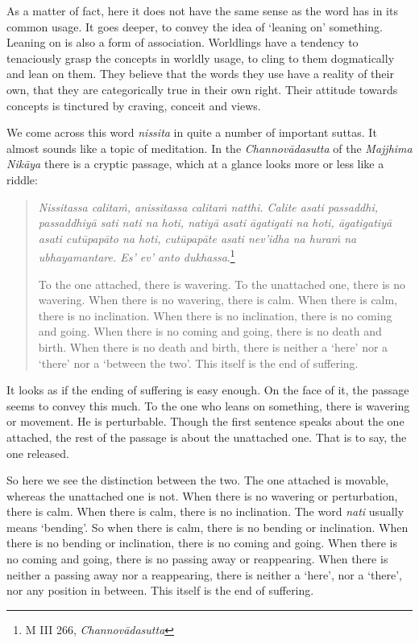As a matter of fact, here it does not have the same sense as the word has in its common usage. It goes deeper, to convey the idea of `leaning on' something. Leaning on is also a form of association. Worldlings have a tendency to tenaciously grasp the concepts in worldly usage, to cling to them dogmatically and lean on them. They believe that the words they use have a reality of their own, that they are categorically true in their own right. Their attitude towards concepts is tinctured by craving, conceit and views.

We come across this word \emph{nissita} in quite a number of important suttas. It almost sounds like a topic of meditation. In the \emph{Channovādasutta} of the \emph{Majjhima Nikāya} there is a cryptic passage, which at a glance looks more or less like a riddle:

\begin{quote}
\emph{Nissitassa calitaṁ, anissitassa calitaṁ natthi. Calite asati passaddhi, passaddhiyā sati nati na hoti, natiyā asati āgatigati na hoti, āgatigatiyā asati cutūpapāto na hoti, cutūpapāte asati nev'idha na huraṁ na ubhayamantare. Es' ev' anto dukhassa}.\footnote{M III 266, \emph{Channovādasutta}}

To the one attached, there is wavering. To the unattached one, there is no wavering. When there is no wavering, there is calm. When there is calm, there is no inclination. When there is no inclination, there is no coming and going. When there is no coming and going, there is no death and birth. When there is no death and birth, there is neither a `here' nor a `there' nor a `between the two'. This itself is the end of suffering.
\end{quote}

It looks as if the ending of suffering is easy enough. On the face of it, the passage seems to convey this much. To the one who leans on something, there is wavering or movement. He is perturbable. Though the first sentence speaks about the one attached, the rest of the passage is about the unattached one. That is to say, the one released.

So here we see the distinction between the two. The one attached is movable, whereas the unattached one is not. When there is no wavering or perturbation, there is calm. When there is calm, there is no inclination. The word \emph{nati} usually means `bending'. So when there is calm, there is no bending or inclination. When there is no bending or inclination, there is no coming and going. When there is no coming and going, there is no passing away or reappearing. When there is neither a passing away nor a reappearing, there is neither a `here', nor a `there', nor any position in between. This itself is the end of suffering.

